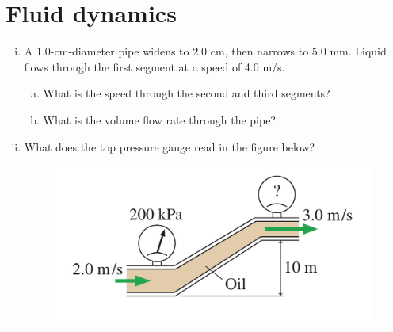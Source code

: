\documentclass[11pt]{article}
\begin{document}
\section{Fluid dynamics}
\begin{enumerate}[(i)]


\item A 1.0-cm-diameter pipe widens to 2.0 cm, then narrows to 5.0 mm. Liquid flows through the first segment at a speed of 4.0 m/s.
\begin{enumerate}[(a)]
	\item What is the speed through the second and third segments?
	\item What is the volume flow rate through the pipe? 
\end{enumerate}

\newpage
\item What does the top pressure gauge read in the figure below?



\begin{figure}[h!]
	\centering
	\includegraphics[width=0.5\linewidth]{pset2_fig1}
	\end{figure}


\end{enumerate}
\end{document}
